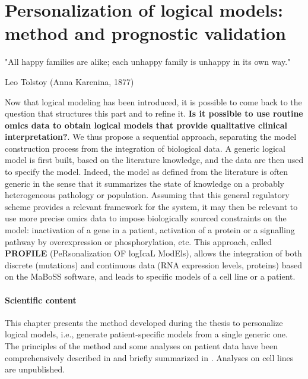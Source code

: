 \documentclass[a4paper,12pt,twoside,onecolumn,openright,final,oldfontcommands]{memoir}
\newcommand{\initial}[1]{
	\lettrine[lines=3,lhang=0.33,nindent=0em]{
		\color{gray}
     		{\textsc{#1}}}{}}
\let\BeginKnitrBlock\begin \let\EndKnitrBlock\end
\begin{document}
\chapter{Personalization of logical models: method and prognostic
validation}\label{personalization-of-logical-models-method-and-prognostic-validation}

\epigraph{"All happy families are alike; each unhappy family is unhappy in its own way."}{Leo Tolstoy (Anna Karenina, 1877)}

\initial{N}ow that logical modeling has been introduced, it is possible
to come back to the question that structures this part and to refine it.
\textbf{Is it possible to use routine omics data to obtain logical
models that provide qualitative clinical interpretation?}. We thus
propose a sequential approach, separating the model construction process
from the integration of biological data. A generic logical model is
first built, based on the literature knowledge, and the data are then
used to specify the model. Indeed, the model as defined from the
literature is often generic in the sense that it summarizes the state of
knowledge on a probably heterogeneous pathology or population. Assuming
that this general regulatory scheme provides a relevant framework for
the system, it may then be relevant to use more precise omics data to
impose biologically sourced constraints on the model: inactivation of a
gene in a patient, activation of a protein or a signalling pathway by
overexpression or phosphorylation, etc. This approach, called
\textbf{PROFILE} (PeRsonalization OF logIcaL ModEls), allows the
integration of both discrete (mutations) and continuous data (RNA
expression levels, proteins) based on the MaBoSS software, and leads to
specific models of a cell line or a patient.

\BeginKnitrBlock{summarybox}
\subsubsection*{Scientific content}\label{scientific-content-2}

This chapter presents the method developed during the thesis to
personalize logical models, i.e., generate patient-specific models from
a single generic one. The principles of the method and some analyses on
patient data have been comprehensively described in
\citet{beal2019personalization} and briefly summarized in
\citet{beal2020personalized}. Analyses on cell lines are unpublished.
\EndKnitrBlock{summarybox}
\end{document}
